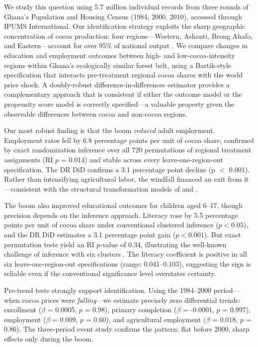 \documentclass[12pt]{article}
\begin{document}
We study this question using 5.7 million individual records from three rounds of Ghana's Population and Housing Census (1984, 2000, 2010), accessed through IPUMS International. Our identification strategy exploits the sharp geographic concentration of cocoa production: four regions---Western, Ashanti, Brong Ahafo, and Eastern---account for over 95\% of national output \citep{vigneri2005}. We compare changes in education and employment outcomes between high- and low-cocoa-intensity regions within Ghana's ecologically similar forest belt, using a Bartik-style specification that interacts pre-treatment regional cocoa shares with the world price shock. A doubly-robust difference-in-differences estimator \citep{santanna2020} provides a complementary approach that is consistent if either the outcome model or the propensity score model is correctly specified---a valuable property given the observable differences between cocoa and non-cocoa regions.

Our most robust finding is that the boom \textit{reduced} adult employment. Employment rates fell by 6.8 percentage points per unit of cocoa share, confirmed by exact randomization inference over all 720 permutations of regional treatment assignments (RI $p$ = 0.014) and stable across every leave-one-region-out specification. The DR DiD confirms a 3.1 percentage point decline (p $<$ 0.001). Rather than intensifying agricultural labor, the windfall financed an exit from it---consistent with the structural transformation models of \citet{lewis1954} and \citet{mcmillan2014}.

The boom also improved educational outcomes for children aged 6--17, though precision depends on the inference approach. Literacy rose by 5.5 percentage points per unit of cocoa share under conventional clustered inference ($p < 0.05$), and the DR DiD estimates a 3.1 percentage point gain ($p < 0.001$). But exact permutation tests yield an RI $p$-value of 0.34, illustrating the well-known challenge of inference with six clusters \citep{cameron2008}. The literacy coefficient is positive in all six leave-one-region-out specifications (range: 0.041--0.103), suggesting the sign is reliable even if the conventional significance level overstates certainty.

Pre-trend tests strongly support identification. Using the 1984--2000 period---when cocoa prices were \textit{falling}---we estimate precisely zero differential trends: enrollment ($\beta$ = 0.0005, $p$ = 0.98), primary completion ($\beta$ = -0.0001, $p$ = 0.997), employment ($\beta$ = 0.009, $p$ = 0.60), and agricultural employment ($\beta$ = 0.018, $p$ = 0.86). The three-period event study confirms the pattern: flat before 2000, sharp effects only during the boom.
\end{document}
